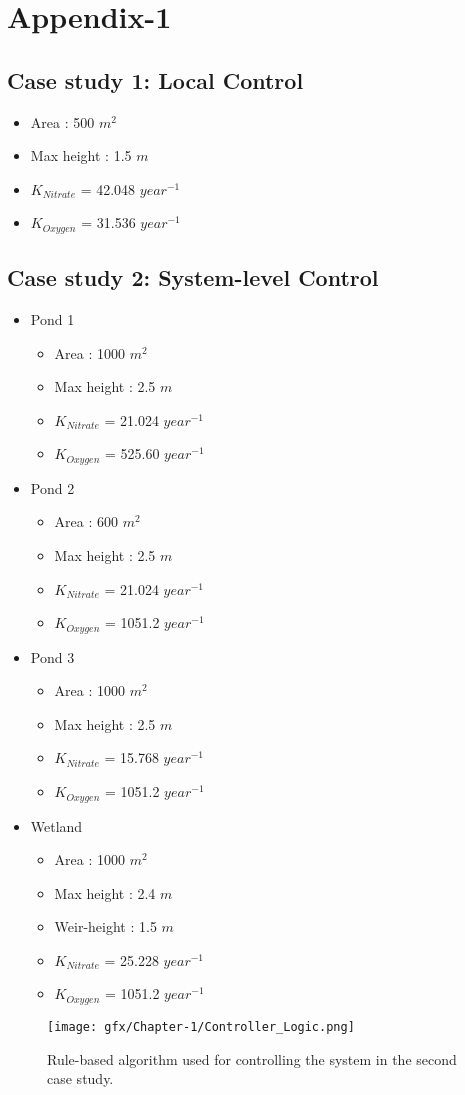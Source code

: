 
\chapter{Appendix-1}\label{Appendix-1}
\section{Case study 1: Local Control}
\begin{itemize}
  \item Area : 500 $m^2$
  \item Max height : 1.5 $m$
  \item $K_{Nitrate}$ = 42.048 $year^{-1}$
  \item $K_{Oxygen}$ =  31.536 $year^{-1}$
\end{itemize} 
\section{Case study 2: System-level Control}
\begin{itemize}
\item Pond 1 
\begin{itemize}    
  \item Area : 1000 $m^2$
  \item Max height : 2.5 $m$
  \item $K_{Nitrate}$ = 21.024 $year^{-1}$
  \item $K_{Oxygen}$ = 525.60 $year^{-1}$
\end{itemize}
\item Pond 2  
\begin{itemize}
  \item Area : 600 $m^2$
  \item Max height : 2.5 $m$
  \item $K_{Nitrate}$ = 21.024 $year^{-1}$
  \item $K_{Oxygen}$ = 1051.2 $year^{-1}$
\end{itemize}
\item Pond 3 
\begin{itemize}
  \item Area : 1000 $m^2$
  \item Max height : 2.5 $m$
  \item $K_{Nitrate}$ = 15.768 $year^{-1}$
  \item $K_{Oxygen}$ = 1051.2 $year^{-1}$
\end{itemize}
\item Wetland  
\begin{itemize}
  \item Area : 1000 $m^2$
  \item Max height : 2.4 $m$
  \item Weir-height : 1.5 $m$ 
  \item $K_{Nitrate}$ = 25.228 $year^{-1}$
  \item $K_{Oxygen}$ = 1051.2 $year^{-1}$
\end{itemize}
\end{itemize}

\begin{figure}[!ht]
  \texttt{[image: gfx/Chapter-1/Controller\_Logic.png]}
  \caption{Rule-based algorithm used for controlling the system in the second case study.}\label{fgr:sys_logic}
\end{figure}
